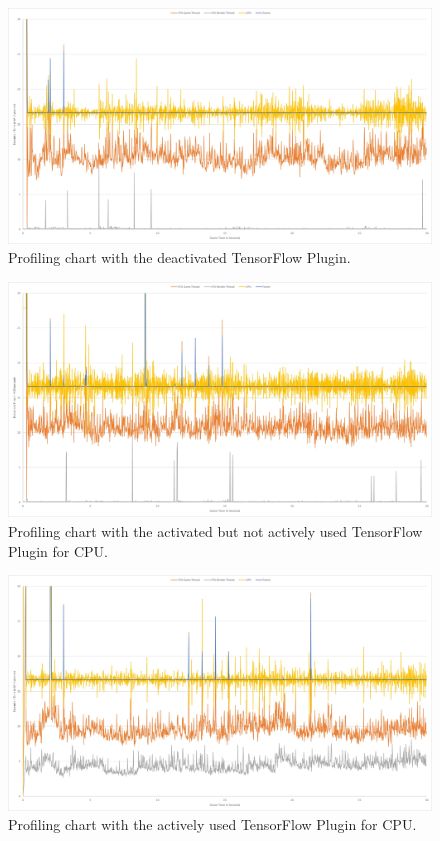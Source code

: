 \documentclass[MGS,Master,english]{twbook}%
\begin{document}
\begin{figure}[!htbp]
	\centering
	\includegraphics[width=1.0\linewidth]{PICs/Profiling/deactivated_plugin}
	\caption{Profiling chart with the deactivated TensorFlow Plugin.}
\end{figure}

\begin{figure}[!htbp]
	\centering
	\includegraphics[width=1.0\linewidth]{PICs/Profiling/activated_plugin_no_tf_used}
	\caption{Profiling chart with the activated but not actively used TensorFlow Plugin for CPU.}
\end{figure}

\begin{figure}[!htbp]
	\centering
	\includegraphics[width=1.0\linewidth]{PICs/Profiling/tf_cpu}
	\caption{Profiling chart with the actively used TensorFlow Plugin for CPU.}
\end{figure}
\end{document}
